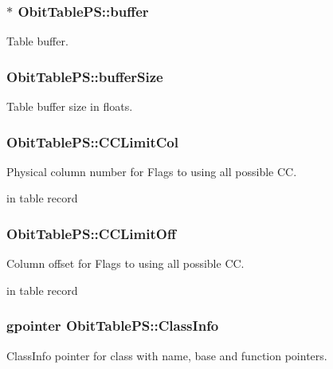 \subsubsection{$\ast$ {\bf Obit\-Table\-PS::buffer}}\label{structObitTablePS_o10}


Table buffer. 

\subsubsection{ {\bf Obit\-Table\-PS::buffer\-Size}}\label{structObitTablePS_o11}


Table buffer size in floats. 

\subsubsection{ {\bf Obit\-Table\-PS::CCLimit\-Col}}\label{structObitTablePS_o33}


Physical column number for Flags to using all possible CC. 

in table record 
\subsubsection{ {\bf Obit\-Table\-PS::CCLimit\-Off}}\label{structObitTablePS_o32}


Column offset for Flags to using all possible CC. 

in table record 
\subsubsection{\setlength{\rightskip}{0pt plus 5cm}gpointer {\bf Obit\-Table\-PS::Class\-Info}}\label{structObitTablePS_o1}


Class\-Info pointer for class with name, base and function pointers. 

